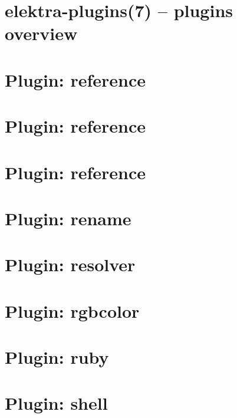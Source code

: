 \let\mypdfximage\pdfximage\def\pdfximage{\immediate\mypdfximage}\documentclass[twoside]{book}
\newcommand{\+}{\discretionary{\mbox{\scriptsize$\hookleftarrow$}}{}{}}
\begin{document}
\chapter{elektra-\/plugins(7) -- plugins overview}
\label{src_plugins_README_md}

\chapter{Plugin\+: reference}
\label{md_src_plugins_reference_examples_alternative_README}

\chapter{Plugin\+: reference}
\label{md_src_plugins_reference_examples_complex_README}

\chapter{Plugin\+: reference}
\label{md_src_plugins_reference_README}

\chapter{Plugin\+: rename}
\label{md_src_plugins_rename_README}

\chapter{Plugin\+: resolver}
\label{md_src_plugins_resolver_README}

\chapter{Plugin\+: rgbcolor}
\label{md_src_plugins_rgbcolor_README}

\chapter{Plugin\+: ruby}
\label{md_src_plugins_ruby_README}

\chapter{Plugin\+: shell}
\label{md_src_plugins_shell_README}

\end{document}
